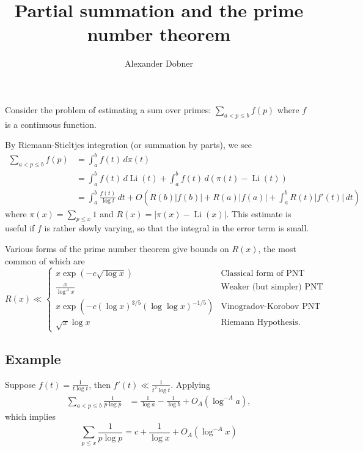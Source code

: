 \documentclass{article}
\newcommand{\Li}{\operatorname{Li}}
\begin{document}
\title{Partial summation and the prime number theorem}
\author{Alexander Dobner}
\date{}
\maketitle

Consider the problem of estimating a sum over primes: $\sum_{a < p \leq b} f(p)$ where $f$ is a continuous function.

By Riemann-Stieltjes integration (or summation by parts), we see
\begin{align*}
\sum_{a < p \leq b} f(p) &= \int_a^b f(t) \, d\pi(t) \\
&= \int_a^b f(t) \, d\Li(t) + \int_a^b f(t) \, d(\pi(t)-\Li(t)) \\
&= \int_a^b \frac{f(t)}{\log t} \, dt + O\left(R(b) |f(b)| + R(a)|f(a)| +\int_a^b R(t) |f'(t)|\, dt\right)
\end{align*}
where $\pi(x) = \sum_{p\leq x} 1$ and $R(x) = | \pi(x)-\Li(x)|$. This estimate is useful if $f$ is rather slowly varying, so that the integral in the error term is small.

Various forms of the prime number theorem give bounds on $R(x)$, the most common of which are
\begin{equation*}
R(x) \ll
\begin{cases}
x \exp(-c \sqrt{\log x})  &\text{Classical form of PNT} \\
\frac{x}{\log^A x} &\text{Weaker (but simpler) PNT} \\
x \exp\left(-c (\log x)^{3/5} (\log\log x)^{-1/5}\right) &\text{Vinogradov-Korobov PNT} \\
\sqrt{x} \log x &\text{Riemann Hypothesis}.
\end{cases}
\end{equation*}

\subsection*{Example}
Suppose $f(t) = \frac{1}{t \log t}$, then $f'(t) \ll \frac{1}{t^2 \log t}$. Applying
\begin{align*}
\sum_{a < p \leq b} \frac{1}{p \log p} &= \frac{1}{\log a} - \frac{1}{\log b} + O_A\left(\log^{-A }a\right),
\end{align*}
which implies
\[
\sum_{p \leq x}\frac{1}{p \log p} = c+\frac{1}{\log x} + O_A\left(\log^{-A} x\right)
\]
\end{document}
